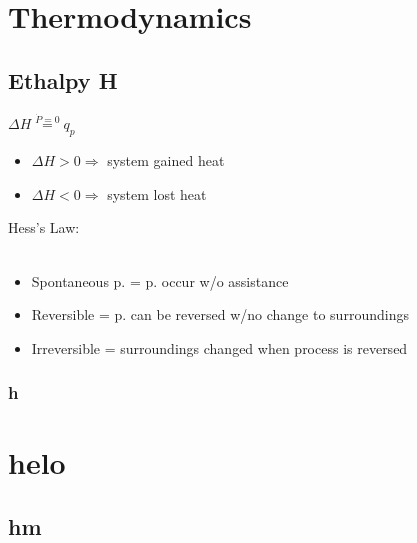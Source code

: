 \documentclass[ wastespaceontitle, english]{cheat_sheet_template}
\begin{document}
\section{Thermodynamics}
    \subsection{Ethalpy H}
    $ \Delta H  \stackrel{\dot{P}=0}{=}  q_p $
    \begin{itemize}
        \item $\Delta H > 0 \Rightarrow$ system gained heat
        \item $\Delta H < 0 \Rightarrow$ system lost heat
    \end{itemize}
    Hess's Law: \\
     \\
    \begin{itemize}
        \item Spontaneous p. = p. occur w/o assistance
        \item Reversible = p. can be reversed w/no change to surroundings
        \item Irreversible = surroundings changed when process is reversed
    \end{itemize}
        \subsubsection{h}
       
\lipsum
\section{helo}
\subsection{hm}
\lipsum
\end{document}
